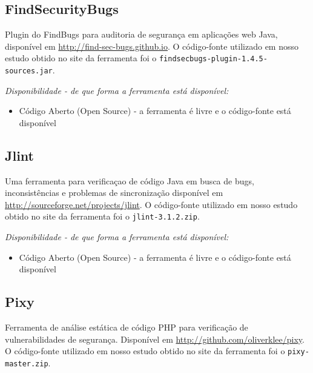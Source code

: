 \subsection{FindSecurityBugs}

Plugin do FindBugs para auditoria de segurança em aplicações web Java,
disponível em \url{http://find-sec-bugs.github.io}.  O código-fonte utilizado
em nosso estudo obtido no site da ferramenta foi o
\texttt{findsecbugs-plugin-1.4.5-sources.jar}.

\begin{description}

  \item {\it Disponibilidade - de que forma a ferramenta está disponível:}
    \begin{itemize}
      \item Código Aberto (Open Source) - a ferramenta é livre e o código-fonte está disponível
    \end{itemize}

\end{description}

\subsection{Jlint}

Uma ferramenta para verificaçao de código Java em busca de bugs,
inconsistências e problemas de sincronização disponível em
\url{http://sourceforge.net/projects/jlint}.  O código-fonte utilizado em
nosso estudo obtido no site da ferramenta foi o \texttt{jlint-3.1.2.zip}.

\begin{description}

  \item {\it Disponibilidade - de que forma a ferramenta está disponível:}
    \begin{itemize}
      \item Código Aberto (Open Source) - a ferramenta é livre e o código-fonte está disponível
    \end{itemize}

\end{description}

\subsection{Pixy}

Ferramenta de análise estática de código PHP para verificação de
vulnerabilidades de segurança. Disponível em
\url{http://github.com/oliverklee/pixy}. O código-fonte utilizado em nosso
estudo obtido no site da ferramenta foi o \texttt{pixy-master.zip}.

